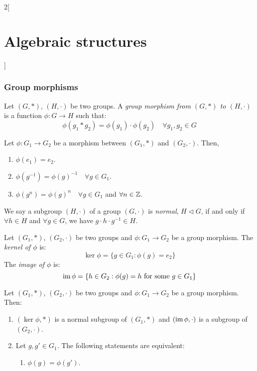 \documentclass[../../../main.tex]{subfiles}
\begin{document}
\begin{multicols}{2}[\section{Algebraic structures}]
    \subsubsection*{Group morphisms}
    \begin{definition}\label{AS-groupmorphism}
        Let $(G,*)$, $(H,\cdot)$ be two groups. A \textit{group morphism from $(G,*)$ to $(H,\cdot)$} is a function $\phi:G\rightarrow H$ such that: $$\phi(g_1*g_2)=\phi(g_1)\cdot\phi(g_2)\quad\forall g_1,g_2\in G$$
    \end{definition}
    \begin{lemma}
        Let $\phi:G_1\rightarrow G_2$ be a morphism between $(G_1,*)$ and $(G_2,\cdot)$. Then,
        \begin{enumerate}
            \item $\phi(e_1)=e_2$.
            \item $\phi(g^{-1})=\phi(g)^{-1}\quad\forall g\in G_1$.
            \item $\phi(g^n)=\phi(g)^n\quad\forall g\in G_1$ and $\forall n\in\mathbb{Z} $.
        \end{enumerate}
    \end{lemma}
    \begin{definition}
        We say a subgroup $(H,\cdot)$ of a group $(G,\cdot)$ is \textit{normal}, $H\lhd G$, if and only if $\forall h\in H$ and $\forall g\in G$, we have $g\cdot h\cdot g^{-1}\in H$.
    \end{definition}
    \begin{definition}
        Let $(G_1,*)$, $(G_2,\cdot)$ be two groups and $\phi:G_1\rightarrow G_2$ be a group morphism. The \textit{kernel of $\phi$} is: $$\ker\phi=\{g\in G_1:\phi(g)=e_2\}$$
        The \textit{image of $\phi$} is: $$\operatorname{im}\phi=\{h\in G_2:\phi(g)=h\text{ for some }g\in G_1\}$$
    \end{definition}
    \begin{prop}
        Let $(G_1,*)$, $(G_2,\cdot)$ be two groups and $\phi:G_1\rightarrow G_2$ be a group morphism. Then:
        \begin{enumerate}
            \item $(\ker\phi,*)$ is a normal subgroup of $(G_1,*)$ and $(\operatorname{im}\phi,\cdot)$ is a subgroup of $(G_2,\cdot)$.
            \item Let $g,g'\in G_1$. The following statements are equivalent:
                  \begin{enumerate}
                      \item $\phi(g)=\phi(g')$.

\end{enumerate}
\end{enumerate}
\end{prop}
\end{multicols}
\end{document}
